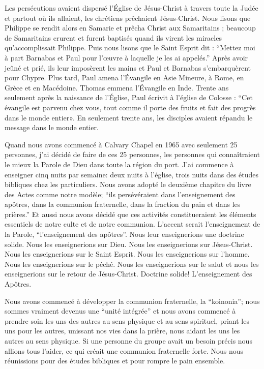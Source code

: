 Les persécutions avaient dispersé l’Église de Jésus-Christ à travers toute la Judée et partout où ils allaient, les
chrétiens prêchaient Jésus-Christ. Nous lisons que Philippe se rendit alors en Samarie et prêcha Christ aux Samaritains
; beaucoup de Samaritains crurent et furent baptisés quand ils virent les miracles qu’accomplissait Philippe. Puis nous
lisons que le Saint Esprit dit : “Mettez moi à part Barnabas et Paul pour l’œuvre à laquelle je les ai appelés.” Après
avoir jeûné et prié, ils leur imposèrent les mains et Paul et Barnabas s’embarquèrent pour Chypre. Plus tard, Paul
amena l’Évangile en Asie Mineure, à Rome, en Grèce et en Macédoine. Thomas emmena l’Évangile en Inde. Trente
ans seulement après la naissance de l’Église, Paul écrivit à l’église de Colosse : “Cet évangile est parvenu chez vous,
tout comme il porte des fruits et fait des progrès dans le monde entier». En seulement trente ans, les disciples
avaient répandu le message dans le monde entier.

Quand nous avons commencé à Calvary Chapel en 1965 avec seulement 25 personnes, j’ai décidé de faire de ces 25
personnes, les personnes qui connaîtraient le mieux la Parole de Dieu dans toute la région du port. J’ai commence à
enseigner cinq nuits par semaine: deux nuits à l'église, trois nuits dans des études bibliques chez les particuliers. Nous
avons adopté le deuxième chapitre du livre des Actes comme notre modèle; “ils persévéraient dans l’enseignement
des apôtres, dans la communion fraternelle, dans la fraction du pain et dans les prières.” Et aussi nous avons décidé
que ces activités constitueraient les éléments essentiels de notre culte et de notre communion. L’accent serait
l’enseignement de la Parole, “l’enseignement des apôtres”. Nous leur enseignerions une doctrine solide. Nous les
enseignerions sur Dieu. Nous les enseignerions sur Jésus-Christ. Nous les enseignerions sur le Saint Esprit. Nous les
enseignerions sur l’homme. Nous les enseignerions sur le péché. Nous les enseignerions sur le salut et nous les
enseignerions sur le retour de Jésus-Christ. Doctrine solide! L’enseignement des Apôtres.

Nous avons commencé à développer la communion fraternelle, la “koinonia”; nous sommes vraiment devenus une
“unité intégrée” et nous avons commencé à prendre soin les uns des autres au sens physique et au sens spirituel,
priant les uns pour les autres, unissant nos vies dans la prière, nous aidant les uns les autres au sens physique. Si une
personne du groupe avait un besoin précis nous allions tous l’aider, ce qui créait une communion fraternelle forte.
Nous nous réunissions pour des études bibliques et pour rompre le pain ensemble.

